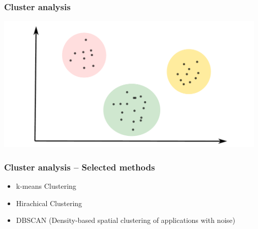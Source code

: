\documentclass[aspectratio=169]{beamer}
\begin{document}
\begin{frame}
  \frametitle{Cluster analysis}
  \begin{center}
    \includegraphics[width=13.0cm]{images/clustering_2.pdf}
  \end{center}  
\end{frame}

\begin{frame}
  \frametitle{Cluster analysis -- Selected methods}
  \begin{block}{}
    \begin{center}
      \begin{itemize}
      \item k-means Clustering
      \item Hirachical Clustering
      \item DBSCAN (Density-based spatial clustering of applications
        with noise)
      \end{itemize}
    \end{center}
  \end{block}
\end{frame}



\end{document}

